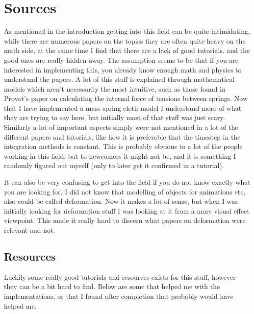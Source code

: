 \chapter{Sources}
As mentioned in the introduction getting into this field can be quite intimidating,
while there are numerous papers on the topics they are often quite heavy on the math side,
at the same time I find that there are a lack of good tutorials, and the good ones are really hidden away.
The assumption seems to be that if you are interested in implementing this, 
you already know enough math and physics to understand the papers.
A lot of this stuff is explained through mathematical models which aren't necessarily the most intuitive,
such as those found in Provot's paper\cite{provot_mass_spring} on calculating the internal force of tensions between springs.
Now that I have implemented a mass spring cloth model I understand more of what they are trying to say here,
but initially most of that stuff was just scary.
Similarly a lot of important aspects simply were not mentioned in a lot of the different papers and tutorials,
like how it is preferable that the timestep in the integration methods is constant.
This is probably obvious to a lot of the people working in this field, but to newcomers it might not be,
and it is something I randomly figured out myself (only to later get it confirmed in a tutorial).

It can also be very confusing to get into the field if you do not know exactly what you are looking for. 
I did not know that modelling of objects for animations etc, also could be called deformation.
Now it makes a lot of sense, but when I was initially looking for deformation stuff I was looking at it from a more visual effect
viewpoint. This made it really hard to discern what papers on deformation were relevant and not.


\section{Resources}
Luckily some really good tutorials and resources exists for this stuff, however they can be a bit hard to find.
Below are some that helped me with the implementations, or that I found after completion that probably would have helped me.

